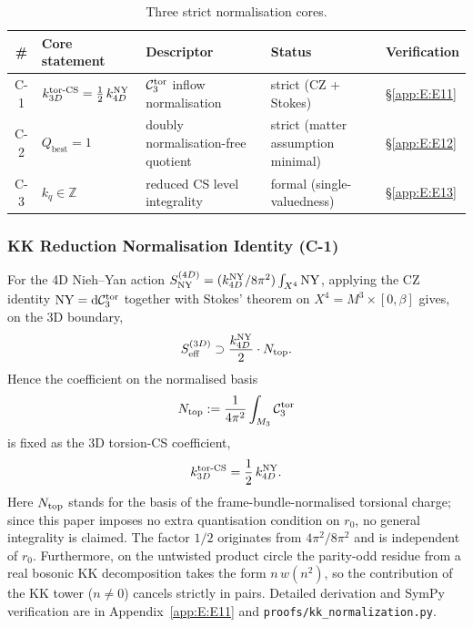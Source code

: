 \begin{table}[H]
\centering\small
\begingroup
\renewcommand{\arraystretch}{1.5}
\begin{tabularx}{\linewidth}{clXYp{3.5cm}}
\toprule
\# & Core statement & Descriptor & Status & Verification \\
\midrule
C-1 & $k_{3D}^{\mathrm{tor\text{-}CS}} = \tfrac{1}{2}\,k_{4D}^{\mathrm{NY}}$ & $\mathcal{C}_3^{\mathrm{tor}}$ inflow normalisation & strict (CZ + Stokes) & \S\ref{app:E:E11} \\
C-2 & $Q_{\mathrm{best}} = 1$ & doubly normalisation-free quotient & strict (matter assumption minimal) & \S\ref{app:E:E12} \\
C-3 & $k_q\in\mathbb{Z}$ & reduced CS level integrality & formal (single-valuedness) & \S\ref{app:E:E13} \\
\bottomrule
\end{tabularx}
\endgroup
\caption{Three strict normalisation cores.}
\label{tab:appB_cores}
\end{table}

\subsubsection{KK Reduction Normalisation Identity (C-1)}
\label{app:B:C1}

For the 4D Nieh--Yan action
$S_{\mathrm{NY}}^{(4D)} = (k_{4D}^{\mathrm{NY}}/8\pi^2)\int_{X^4}\mathrm{NY}$, applying the CZ
identity $\mathrm{NY} = \mathrm{d}\mathcal{C}_3^{\mathrm{tor}}$ together with Stokes' theorem on
$X^4 = M^3\times[0,\beta]$ gives, on the 3D boundary,
\begin{equation}
  S_{\mathrm{eff}}^{(3D)} \supset \frac{k_{4D}^{\mathrm{NY}}}{2}\cdot N_{\mathrm{top}}.
\end{equation}
Hence the coefficient on the normalised basis
\begin{equation}
  N_{\mathrm{top}} := \frac{1}{4\pi^2}\int_{M_3}\mathcal{C}_3^{\mathrm{tor}}
\end{equation}
is fixed as the 3D torsion-CS coefficient,
\begin{equation}
  k_{3D}^{\mathrm{tor\text{-}CS}} = \frac{1}{2}\,k_{4D}^{\mathrm{NY}}.
\end{equation}
Here $N_{\mathrm{top}}$ stands for the basis of the frame-bundle-normalised torsional
charge; since this paper imposes no extra quantisation condition on $r_0$,
no general integrality is claimed.  The factor $1/2$ originates from
$4\pi^2/8\pi^2$ and is independent of $r_0$.  Furthermore, on the untwisted
product circle the parity-odd residue from a real bosonic KK decomposition
takes the form $n\,w(n^2)$, so the contribution of the KK tower
($n\neq 0$) cancels strictly in pairs.  Detailed derivation and SymPy
verification are in Appendix~\ref{app:E:E11} and
\texttt{proofs/kk\_normalization.py}.


